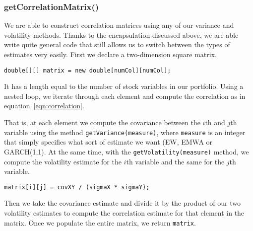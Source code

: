 \documentclass[../Dissertation.tex]{subfiles}
\begin{document}
\subsubsection{getCorrelationMatrix()}

We are able to construct correlation matrices using any of our variance and volatility methods.
Thanks to the encapsulation discussed above, we are able write quite general code that still allows us to switch between the types of estimates very easily.
First we declare a two-dimension square matrix.
\begin{center}
	\lstinline|double[][] matrix = new double[numCol][numCol];|
\end{center}
It has a length equal to the number of stock variables in our portfolio.
Using a nested loop, we iterate through each element and compute the correlation as in equation~\ref{eqn:correlation}.

That is, at each element we compute the covariance between the $i$th and $j$th variable using the method \lstinline|getVariance(measure)|, where \lstinline|measure| is an integer that simply specifies what sort of estimate we want (EW, EMWA or GARCH(1,1).
At the same time, with the \lstinline|getVolatility(measure)| method, we compute the volatility estimate for the $i$th variable and the same for the $j$th variable.
\begin{lstlisting}[firstnumber = 94]
	matrix[i][j] = covXY / (sigmaX * sigmaY);
\end{lstlisting}
Then we take the covariance estimate and divide it by the product of our two volatility estimates to compute the correlation estimate for that element in the matrix.
Once we populate the entire matrix, we return \lstinline|matrix|.
\end{document}
